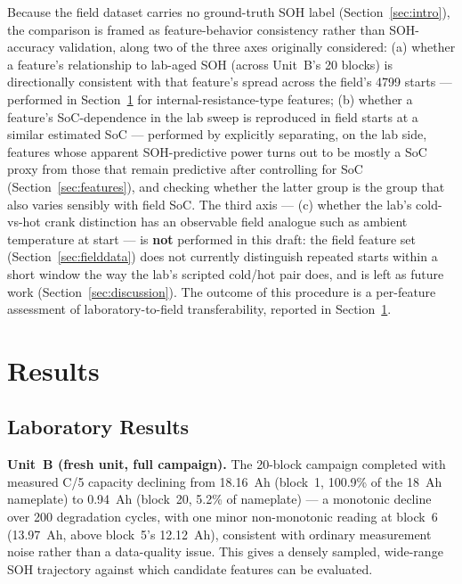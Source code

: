 \documentclass[conference]{IEEEtran}
\begin{document}
Because the field dataset carries no ground-truth SOH label (Section~\ref{sec:intro}), the comparison is framed as feature-behavior consistency rather than SOH-accuracy validation, along two of the three axes originally considered: (a) whether a feature's relationship to lab-aged SOH (across Unit~B's 20 blocks) is directionally consistent with that feature's spread across the field's 4799 starts --- performed in Section~\ref{sec:results} for internal-resistance-type features; (b) whether a feature's SoC-dependence in the lab sweep is reproduced in field starts at a similar estimated SoC --- performed by explicitly separating, on the lab side, features whose apparent SOH-predictive power turns out to be mostly a SoC proxy from those that remain predictive after controlling for SoC (Section~\ref{sec:features}), and checking whether the latter group is the group that also varies sensibly with field SoC. The third axis --- (c) whether the lab's cold-vs-hot crank distinction has an observable field analogue such as ambient temperature at start --- is \textbf{not} performed in this draft: the field feature set (Section~\ref{sec:fielddata}) does not currently distinguish repeated starts within a short window the way the lab's scripted cold/hot pair does, and is left as future work (Section~\ref{sec:discussion}). The outcome of this procedure is a per-feature assessment of laboratory-to-field transferability, reported in Section~\ref{sec:results}.

\section{Results}
\label{sec:results}

\subsection{Laboratory Results}
\label{sec:results-lab}

\textbf{Unit~B (fresh unit, full campaign).} The 20-block campaign completed with measured C/5 capacity declining from 18.16~Ah (block~1, 100.9\% of the 18~Ah nameplate) to 0.94~Ah (block~20, 5.2\% of nameplate) --- a monotonic decline over 200 degradation cycles, with one minor non-monotonic reading at block~6 (13.97~Ah, above block~5's 12.12~Ah), consistent with ordinary measurement noise rather than a data-quality issue. This gives a densely sampled, wide-range SOH trajectory against which candidate features can be evaluated.
\end{document}
